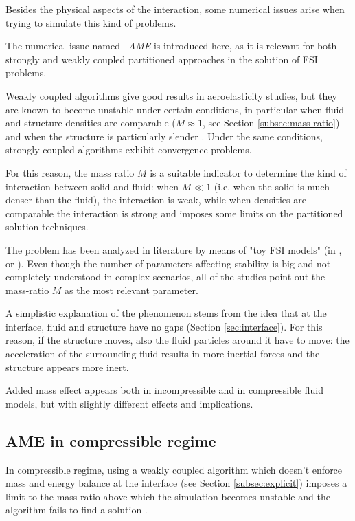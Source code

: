 Besides the physical aspects of the interaction, some numerical issues arise when trying to simulate this kind of problems.

The numerical issue named \textit{~\ac{AME}} is introduced here, as it is relevant for both strongly and weakly coupled partitioned approaches in the solution of FSI problems. 

Weakly coupled algorithms give good results in aeroelasticity studies, but they are known to become unstable under certain conditions, in particular when fluid and structure densities are comparable ($M \approx 1$, see Section \ref{subsec:mass-ratio}) and when the structure is particularly slender \cite{causin2005added}.
Under the same conditions, strongly coupled algorithms exhibit convergence problems.

For this reason, the mass ratio $M$ is a suitable indicator to determine the kind of interaction between solid and fluid: when $M \ll 1$ (i.e. when the solid is much denser than the fluid), the interaction is weak, while when densities are comparable the interaction is strong and imposes some limits on the partitioned solution techniques.

The problem has been analyzed in literature by means of "toy FSI models" (in \cite{causin2005added}, \cite{degroote2008stability} or \cite{mehl2016parallel}). Even though the number of parameters affecting stability is big and not completely understood in complex scenarios, all of the studies point out the mass-ratio $M$ as the most relevant parameter.

A simplistic explanation of the phenomenon stems from the idea that at the interface, fluid and structure have no gaps (Section \ref{sec:interface}). For this reason, if the structure moves, also the fluid particles around it have to move: the acceleration of the surrounding fluid results in more inertial forces and the structure appears more inert. 

Added mass effect appears both in incompressible and in compressible fluid models, but with slightly different effects and implications.


\subsection{AME in compressible regime}  

In compressible regime, using a weakly coupled algorithm which doesn't enforce mass and energy balance at the interface (see Section \ref{subsec:explicit}) imposes a limit to the mass ratio above which the simulation becomes unstable and the algorithm fails to find a solution \cite{bodnar2014fluid}.

